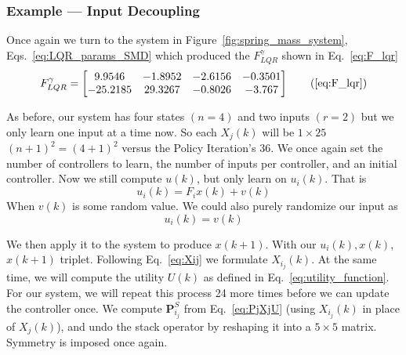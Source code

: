 \FloatBarrier\subsubsection{Example --- Input Decoupling}%
\label{sub:example_input_decoupling}
Once again we turn to the system in Figure~\ref{fig:spring_mass_system}, Eqs.~\ref{eq:LQR_params_SMD} which produced the $F_{LQR}^\gamma$ shown in Eq.~\ref{eq:F_lqr}
\begin{equation}
    F_{LQR}^\gamma=\left[\begin{matrix}9.9546&-1.8952&-2.6156&-0.3501\\-25.2185&29.3267&-0.8026&-3.767\\\end{matrix}\right]
    \tag{\ref{eq:F_lqr}}
\end{equation}

As before, our system has four states $(n=4)$ and two inputs $(r=2)$ but we only learn one input at a time now. So each $X_j\left(k\right)$ will be $1\times25$ ${\left(n+1\right)}^2={\left(4+1\right)}^2$ versus the Policy Iteration's 36. 
We once again set the number of controllers to learn, the number of inputs per controller, and an initial controller.
Now we still compute $u\left(k\right)$, but only learn on $u_i\left(k\right)$. That is
\begin{equation}
    u_i(k)=F_i x\left(k\right)+v\left(k\right)
\end{equation}
When $v\left(k\right)$ is some random value. We could also purely randomize our input as
\begin{equation}
    u_i\left(k\right)=v\left(k\right)
\end{equation}

We then apply it to the system to produce $x\left(k+1\right)$. With our $u_i\left(k\right),x\left(k\right)$, $x\left(k+1\right)$ triplet. Following Eq.~\ref{eq:Xij} we formulate $X_{i_j}(k)$. At the same time, we will compute the utility $U\left(k\right)$ as defined in Eq.~\ref{eq:utility_function}.
For our system, we will repeat this process 24 more times before we can update the controller once. We compute $\textbf{P}_{i_j}^S$ from Eq.~\ref{eq:PjXjU} (using $X_{i_j}(k)$ in place of $X_{j}(k)$), and undo the stack operator by reshaping it into a $5 \times5$ matrix. Symmetry is imposed once again.

